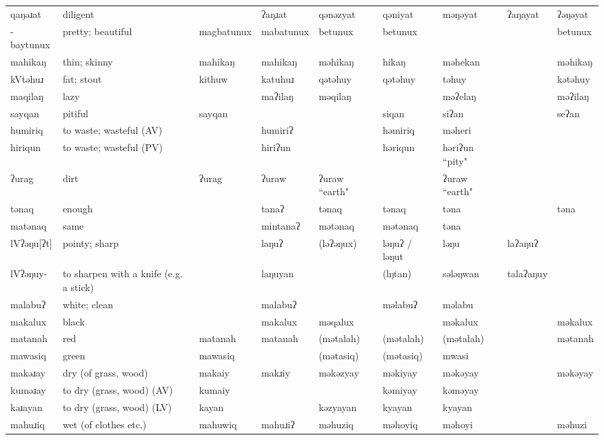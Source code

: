 \begin{landscape}
\begin{longtable}{*{9}{>{\raggedright\arraybackslash}p{}}}
\text{*}qaŋəɹat & diligent &  & ʔaŋɹat & qənəzyat & qəniyat & məŋəyat & ʔaŋayat & ʔəŋəyat\\
\text{*}-baytunux & pretty; beautiful & magbatunux & mabatunux & betunux & betunux &  &  & betunux\\
\text{*}mahikaŋ & thin; skinny & mahikaŋ & mahikaŋ & məhikaŋ & hikaŋ & məhekan &  & məhikaŋ\\
\text{*}kVtəhuɹ & fat; stout & kithuw & katuhuɹ & qətəhuy & qətəhuy & təhuy &  & kətəhuy\\
\text{*}maqilaŋ & lazy &  & maʔilaŋ & məqilaŋ &  & məʔelaŋ &  & məʔilaŋ\\
\text{*}sayqan & pitiful & sayqan &  &  & siqan & siʔan &  & seʔan\\
\text{*}humiriq & to waste; wasteful (AV) &  & humiriʔ &  & həmiriq & məheri &  & \\
\text{*}hiriqun & to waste; wasteful (PV) &  & hiriʔun &  & həriqun & həriʔun ``pity" &  & \\
\text{*}ʔurag & dirt & ʔurag & ʔuraw & ʔuraw ``earth" &  & ʔuraw ``earth" &  & \\
\text{*}tənaq & enough &  & tanaʔ & tənaq & tənaq & təna &  & təna\\
\text{*}matənaq & same &  & mintanaʔ & mətənaq & mətənaq & təna &  & \\
\text{*}lVʔəŋu[ʔt] & pointy; sharp &  & laŋuʔ & (ləʔəŋux) & ləŋuʔ / ləŋut & ləŋu & laʔaŋuʔ & \\
\text{*}lVʔəŋuy- & to sharpen with a knife (e.g. a stick) &  & laŋuyan &  & (lŋtan) & sələŋwan & talaʔaŋuy & \\
\text{*}malabuʔ & white; clean &  & malabuʔ &  & məlabuʔ & məlabu &  & \\
\text{*}makalux & black &  & makalux & məqalux &  & məkalux &  & məkalux\\
\text{*}matanah & red & matanah & matanah & (mətalah) & (mətalah) & (mətalah) &  & mətanah\\
\text{*}mawasiq & green & mawasiq &  & (mətasiq) & (mətasiq) & mwasi &  & \\
\text{*}makəɹay & dry (of grass, wood) & makaiy & makɹiy & məkəzyay & məkiyay & məkəyay &  & məkəyay\\
\text{*}kuməɹay & to dry (grass, wood) (AV) & kumaiy &  &  & kəmiyay & kəməyay &  & \\
\text{*}kəɹayan & to dry (grass, wood) (LV) & kayan &  & kəzyayan & kyayan & kyayan &  & \\
\text{*}mahuɹiq & wet (of clothes etc.) & mahuwiq & mahuɹiʔ & məhuziq & məhoyiq & məhoyi &  & məhuzi\\

\end{longtable}
\end{landscape}
